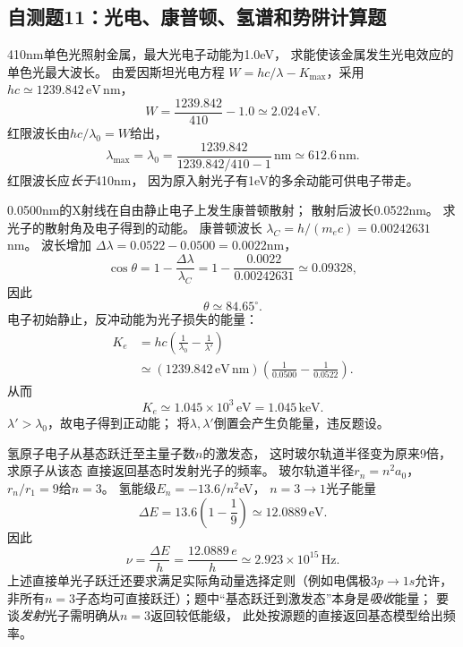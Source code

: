 \subsection{自测题11：光电、康普顿、氢谱和势阱计算题}

\problemtext 410nm单色光照射金属，最大光电子动能为1.0eV，
求能使该金属发生光电效应的单色光最大波长。
\workings
由爱因斯坦光电方程
$W=hc/\lambda-K_{\max}$，采用
$hc\simeq1239.842\,\mathrm{eV\,nm}$，
\[
 W=\frac{1239.842}{410}-1.0
 \simeq2.024\,\mathrm{eV}.
\]
红限波长由$hc/\lambda_0=W$给出，
\[
\boxed{\lambda_{\max}=\lambda_0
=\frac{1239.842}{1239.842/410-1}\,\mathrm{nm}
\simeq612.6\,\mathrm{nm}}.
\]
\crosscheck 红限波长应\emph{长于}410nm，
因为原入射光子有1eV的多余动能可供电子带走。

\problemtext 0.0500nm的X射线在自由静止电子上发生康普顿散射；
散射后波长0.0522nm。
求光子的散射角及电子得到的动能。
\workings
康普顿波长
$\lambda_C=h/(m_ec)=0.00242631$nm。
波长增加
$\Delta\lambda=0.0522-0.0500=0.0022$nm，
\[
\cos\theta=1-\frac{\Delta\lambda}{\lambda_C}
=1-\frac{0.0022}{0.00242631}
\simeq0.09328,
\]
因此
\[
\boxed{\theta\simeq84.65^\circ}.
\]
电子初始静止，反冲动能为光子损失的能量：
\[
\begin{aligned}
K_e&=hc\left(\frac1{\lambda_0}-\frac1{\lambda'}\right)\\
&\simeq(1239.842\,\mathrm{eV\,nm})
\left(\frac1{0.0500}-\frac1{0.0522}\right).
\end{aligned}
\]
从而
\[
\boxed{K_e\simeq1.045\times10^3\,\mathrm{eV}
=1.045\,\mathrm{keV}}.
\]
\crosscheck $\lambda'>\lambda_0$，故电子得到正动能；
将$\lambda,\lambda'$倒置会产生负能量，违反题设。

\problemtext 氢原子电子从基态跃迁至主量子数$n$的激发态，
这时玻尔轨道半径变为原来9倍，求原子从该态
直接返回基态时发射光子的频率。
\workings
玻尔轨道半径$r_n=n^2a_0$，
$r_n/r_1=9$给$n=3$。
氢能级$E_n=-13.6/n^2$eV，
$n=3\to1$光子能量
\[
\Delta E=13.6\left(1-\frac1{9}\right)
\simeq12.0889\,\mathrm{eV}.
\]
因此
\[
\boxed{\nu=\frac{\Delta E}{h}
=\frac{12.0889\,e}{h}
\simeq2.923\times10^{15}\,\mathrm{Hz}}.
\]
\crosscheck 上述直接单光子跃迁还要求满足实际角动量选择定则（例如电偶极$3p\to1s$允许，非所有$n=3$子态均可直接跃迁）；题中“基态跃迁到激发态”本身是\emph{吸收}能量；
要谈\emph{发射}光子需明确从$n=3$返回较低能级，
此处按源题的直接返回基态模型给出频率。

